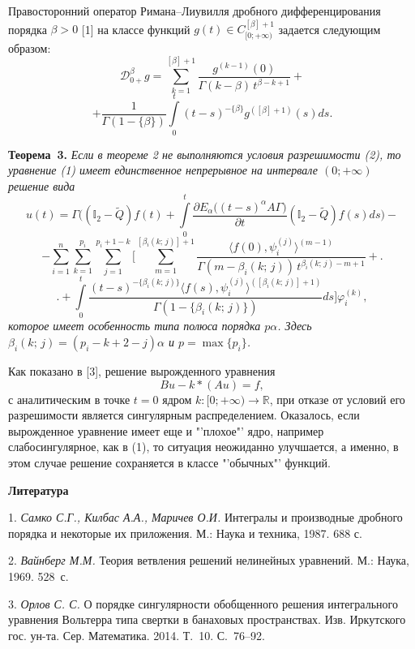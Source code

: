 Правосторонний оператор Римана--Лиувилля дробного дифференцирования порядка $\beta>0$   [1] на классе функций $g(t)\in C_{[0;+\infty)}^{[\beta]+1}$ задается следующим образом:
$$
{\mathscr D}^{\beta}_{0+}g=\sum\limits_{k=1}^{[\beta]+1}\frac{g^{(k-1)}(0)}{\Gamma(k-\beta)\,t^{\beta-k+1}}+
$$
$$
+\frac{1}{\Gamma(1-\lbrace\beta\rbrace)}\int\limits_{0}^{t}(t-s)^{-\lbrace\beta\rbrace}g^{([\beta]+1)}(s)ds.
$$

\textbf{Теорема~3.} {\it Если в теореме 2 не выполняются условия разрешимости (2), то уравнение (1) имеет единственное непрерывное на интервале $(0; +\infty)$ решение вида
$$
u(t)=\Gamma\biggl((\mathbb I_{2}-\tilde{Q})f(t)+\int\limits_{0}^{t}\frac{\partial E_{\alpha}\bigl((t-s)^{\alpha}A\Gamma\bigr)}{\partial t}(\mathbb I_{2}-\tilde{Q})f(s)ds\biggr)-
$$
$$
-\sum\limits_{i=1}^{n}\sum\limits_{k=1}^{p_{i}}\sum\limits_{j=1}^{p_{i}+1-k}\biggl[\sum\limits_{m=1}^{[\beta_{i}(k;\,j)]+1}\frac{\langle f(0),\psi_{i}^{(j)}\rangle^{(m-1)}}{\Gamma(m-\beta_{i}(k;\,j))\,t^{\beta_{i}(k;\,j)-m+1}}+\biggr.
$$
$$
\biggl.+\int\limits_{0}^{t}\frac{(t-s)^{-\lbrace\beta_{i}(k;\,j)\rbrace}\langle f(s),\psi_{i}^{(j)}\rangle^{([\beta_{i}(k;\,j)]+1)}}{\Gamma(1-\lbrace\beta_{i}(k;\,j)\rbrace)}ds\biggr]\varphi_{i}^{(k)},
$$
которое имеет особенность типа полюса порядка $p\alpha$. Здесь $\beta_{i}(k;\,j)=(p_{i}-k+2-j)\alpha$ и $p=\max\lbrace p_{i}\rbrace$.}

Как показано в [3], решение вырожденного уравнения
$$
Bu-k\ast(Au)=f,
$$
с аналитическим в точке $t=0$ ядром $k: [0;+\infty)\to{\mathbb R}$, при отказе  от условий его разрешимости является сингулярным распределением. Оказалось, если вырожденное уравнение имеет еще и "'плохое"' ядро, например слабосингулярное, как в (1), то ситуация неожиданно улучшается, а именно, в этом случае решение сохраняется в классе "'обычных"' функций.
\\
\smallskip \centerline{\bf Литература}\nopagebreak

1. {\it Самко С.Г., Килбас А.А., Маричев О.И.} Интегралы и производные дробного порядка и некоторые их приложения. М.: Наука и техника, 1987. 688 с.

2. {\it Вайнберг М.М.} Теория ветвления решений нелинейных уравнений. М.: Наука, 1969. 528~с.

3. {\it Орлов С. С.} О порядке сингулярности обобщенного решения интегрального уравнения Вольтерра типа свертки в банаховых пространствах. Изв. Иркутского гос. ун-та. Сер. Математика. 2014. Т.~10. С.~76--92.
